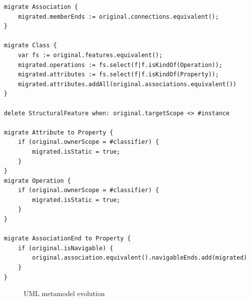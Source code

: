\begin{lstlisting}[caption=UML model migration in Flock, label=lst:flock-uml, language=Flock, float=tb]
migrate Association {
	migrated.memberEnds := original.connections.equivalent();
}

migrate Class {
	var fs := original.features.equivalent();
	migrated.operations := fs.select(f|f.isKindOf(Operation));
	migrated.attributes := fs.select(f|f.isKindOf(Property));
	migrated.attributes.addAll(original.associations.equivalent())
}

delete StructuralFeature when: original.targetScope <> #instance

migrate Attribute to Property {
	if (original.ownerScope = #classifier) {
		migrated.isStatic = true;		
	}
}
migrate Operation {
	if (original.ownerScope = #classifier) {
		migrated.isStatic = true;
	}
}

migrate AssociationEnd to Property {
	if (original.isNavigable) {
		original.association.equivalent().navigableEnds.add(migrated)
	}
}
\end{lstlisting}

\begin{landscape}	
\begin{figure}[ht]
	\centering
	\caption{UML metamodel evolution}
\label{fig:uml_mms}
\end{figure}
\end{landscape}	


